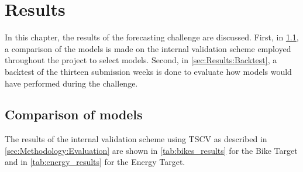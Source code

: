 \newpage
\section{Results}
\label{ch:Results}

In this chapter, the results of the forecasting challenge are discussed. First, in \cref{sec:Results:ComparisonModels}, a comparison of the models is made on the internal validation scheme employed throughout the project to select models. Second, in \cref{sec:Results:Backtest}, a backtest of the thirteen submission weeks is done to evaluate how models would have performed during the challenge. 

\subsection{Comparison of models}
\label{sec:Results:ComparisonModels}

The results of the internal validation scheme using TSCV as described in \cref{sec:Methodology:Evaluation} are shown in \cref{tab:bikes_results} for the Bike Target and in \cref{tab:energy_results} for the Energy Target. 

\begin{table}[htp]
\centering
{}
\caption{Results of Timeseries Cross-Validation on the Bike Target for the full year 2024 with weekly shifting of sliding windows. Best values are highlighted in bold.}
\label{tab:bikes_results}
\end{table}

